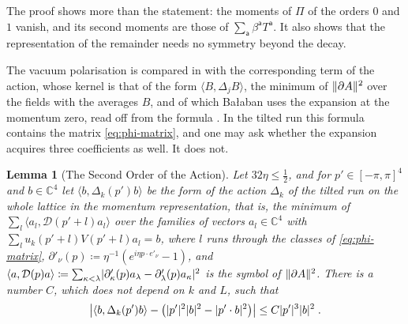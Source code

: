 \documentclass[11pt]{preprint}
\DeclarePairedDelimiter{\abs}{\lvert}{\rvert}
\DeclarePairedDelimiter{\norm}{\lVert}{\rVert}
\numberwithin{equation}{section}
\newtheorem{lemma}[theorem]{Lemma}
\theoremstyle{definition}
\theoremstyle{remark}
\theoremstyle{plain}
\begin{document}
The proof shows more than the statement: the moments of $\Pi$ of the orders $0$ and $1$ vanish, and its second moments are those of $\sum_{\mathsf a}\beta^{\mathsf a}T^{\mathsf a}$. It also shows that the representation of the remainder needs no symmetry beyond the decay.

The vacuum polarisation is compared in \cite{BalabanRG1} with the corresponding term of the action, whose kernel is that of the form $\langle B, \Delta_jB\rangle$, the minimum of $\norm{\partial A}^2$ over the fields with the averages $B$, and of which Ba{\l}aban uses the expansion \cite[(4.41)]{BalabanRG1} at the momentum zero, read off from the formula \cite[(1.66)]{BalabanPRT1}. In the tilted run this formula contains the matrix \eqref{eq:phi-matrix}, and one may ask whether the expansion acquires three coefficients as well. It does not.

\begin{lemma}[The Second Order of the Action]\label{lem:action-second-order}
Let $32\eta \leq \frac12$, and for $p' \in [-\pi, \pi]^4$ and $b \in \mathbb C^4$ let $\langle b, \Delta_k(p')b\rangle$ be the form of the action $\Delta_k$ of the tilted run on the whole lattice in the momentum representation, that is, the minimum of $\sum_l\langle a_l, \mathcal D(p' + l)a_l\rangle$ over the families of vectors $a_l \in \mathbb C^4$ with $\sum_lu_k(p' + l)V(p' + l)a_l = b$, where $l$ runs through the classes of \eqref{eq:phi-matrix}, $\partial'_\nu(p) \coloneqq \eta^{-1}(e^{i\eta p \cdot e'_\nu} - 1)$, and $\langle a, \mathcal D(p)a\rangle \coloneqq \sum_{\kappa<\lambda}\abs{\partial'_\kappa(p)a_\lambda - \partial'_\lambda(p)a_\kappa}^2$ is the symbol of $\norm{\partial A}^2$. There is a number $C$, which does not depend on $k$ and $L$, such that
\begin{equation}\label{eq:action-second-order}
    \bigl\lvert\langle b, \Delta_k(p')b\rangle - \bigl(\abs{p'}^2\abs b^2 - \abs{p' \cdot b}^2\bigr)\bigr\rvert \leq C\abs{p'}^3\abs b^2\;.
\end{equation}
\end{lemma}
\end{document}
